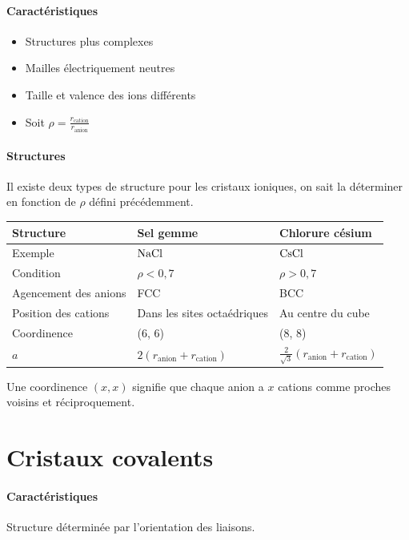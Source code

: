 \documentclass[11pt,a4paper,french]{article}
\begin{document}
\paragraph{Caractéristiques}
\begin{itemize}
	\item Structures plus complexes
	\item Mailles électriquement neutres
	\item Taille et valence des ions différents
	\item Soit $\rho = \frac{r_\mathrm{cation}}{r_\mathrm{anion}}$
\end{itemize}

\paragraph{Structures}
Il existe deux types de structure pour les cristaux ioniques, on sait la déterminer en fonction de $\rho$ défini précédemment.

\begin{center}
	\begin{tabular}{|l|l|l|}
		\hline
		Structure & Sel gemme & Chlorure césium\\
		\hline
		Exemple & $\ce{NaCl}$ & $\ce{CsCl}$\\
		\hline
		Condition & $\rho < 0,7$ & $\rho > 0,7$\\
		\hline
		Agencement des anions & FCC & BCC\\
		\hline
		Position des cations & Dans les sites octaédriques & Au centre du cube\\
		\hline
		Coordinence & (6, 6) & (8, 8)\\
		\hline
		$a$ & $2 (r_\mathrm{anion} + r_\mathrm{cation})$ & $\frac{2}{\sqrt{3}} (r_\mathrm{anion} + r_\mathrm{cation})$\\
		\hline
	\end{tabular}
\end{center}
Une coordinence $(x, x)$ signifie que chaque anion a $x$ cations comme proches voisins et réciproquement.

\section{Cristaux covalents}

\paragraph{Caractéristiques}
Structure déterminée par l'orientation des liaisons.
\end{document}
